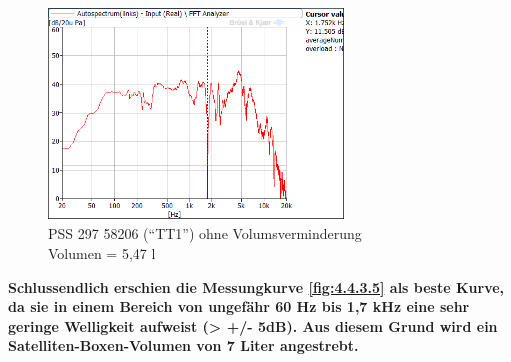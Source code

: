 \begin{figure} [H]
	\centering
	\includegraphics[width=0.7\textwidth]{img/Optimierung/TT/TT1_Styro_5-47l.png}
	\caption{PSS 297 58206 (\enquote{TT1}) ohne Volumsverminderung \\Volumen = 5,47 l}
	\label{fig:4.4.3.7}
\end{figure}

\textbf{Schlussendlich erschien die Messungkurve \ref{fig:4.4.3.5} als beste Kurve, da sie in einem Bereich von ungefähr 60 Hz bis 1,7 kHz eine sehr geringe Welligkeit aufweist (> +/- 5dB).
Aus diesem Grund wird ein Satelliten-Boxen-Volumen von 7 Liter angestrebt.}

